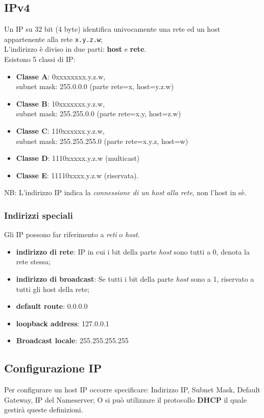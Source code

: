\documentclass[a4paper,11pt]{article}
\def\code#1{\texttt{#1}}
\begin{document}
\subsection{IPv4}
Un IP su 32 bit (4 byte) identifica univocamente una rete ed un host appartenente alla rete \code{x.y.z.w};\\
L'indirizzo è diviso in due parti: \textbf{host} e \textbf{rete}.\\
Esistono 5 classi di IP:
\begin{itemize}
\item\textbf{Classe A}: 0xxxxxxxx.y.z.w,\\ subnet mask: 255.0.0.0 (parte rete=x, host=y.z.w)
\item\textbf{Classe B}: 10xxxxxxx.y.z.w,\\ subnet mask: 255.255.0.0 (parte rete=x.y, host=z.w)
\item\textbf{Classe C}: 110xxxxxx.y.z.w,\\ subnet mask: 255.255.255.0 (parte rete=x.y.z, host=w)
\item\textbf{Classe D}: 1110xxxxx.y.z.w (multicast)
\item\textbf{Classe E}: 11110xxxx.y.z.w (riservata).
\end{itemize} 
NB: L'indirizzo IP indica la \textit{connessione di un host alla rete}, non l'host in sè.
\subsubsection{Indirizzi speciali}
Gli IP possono far riferimento a \textit{reti} o \textit{host}. 
\begin{itemize}
\item \textbf{indirizzo di rete}: IP in cui i bit della parte \textit{host} sono tutti a 0, denota la rete stessa;
\item \textbf{indirizzo di broadcast}: Se tutti i bit della parte \textit{host} sono a 1, riservato a tutti gli host della rete;
\item \textbf{default route}: 0.0.0.0
\item \textbf{loopback address}: 127.0.0.1
\item\textbf{Broadcast locale}: 255.255.255.255
\end{itemize}
\newpage
\subsection{Configurazione IP}
Per configurare un host IP occorre specificare: Indirizzo IP, Subnet Mask, Default Gateway, IP del Nameserver; O si può utilizzare il protocollo \textbf{DHCP} il quale gestirà queste definizioni.
\end{document}

